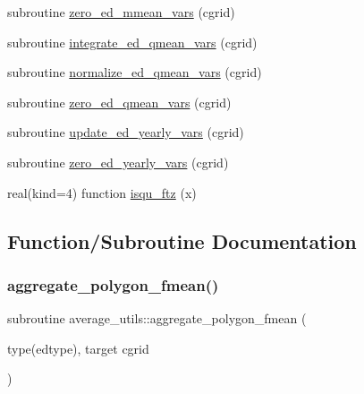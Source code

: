 \begin{DoxyCompactItemize}
\item 
subroutine \hyperlink{namespaceaverage__utils_aa5221fd3b377dfe424dbdcb81b83c378}{zero\+\_\+ed\+\_\+mmean\+\_\+vars} (cgrid)
\item 
subroutine \hyperlink{namespaceaverage__utils_af429d166f6097c18d6ab4ce05adbd31f}{integrate\+\_\+ed\+\_\+qmean\+\_\+vars} (cgrid)
\item 
subroutine \hyperlink{namespaceaverage__utils_ad7f232f9a24079c3430b005098729615}{normalize\+\_\+ed\+\_\+qmean\+\_\+vars} (cgrid)
\item 
subroutine \hyperlink{namespaceaverage__utils_a2e9cb2592327099345c147516b927f51}{zero\+\_\+ed\+\_\+qmean\+\_\+vars} (cgrid)
\item 
subroutine \hyperlink{namespaceaverage__utils_a81384775dd05dba144bf83e9731d5275}{update\+\_\+ed\+\_\+yearly\+\_\+vars} (cgrid)
\item 
subroutine \hyperlink{namespaceaverage__utils_a81df7cc84b1d62f7fb950e91d410abbd}{zero\+\_\+ed\+\_\+yearly\+\_\+vars} (cgrid)
\item 
real(kind=4) function \hyperlink{namespaceaverage__utils_ac90817fe39c27153ed7bbee2cb856611}{isqu\+\_\+ftz} (x)
\end{DoxyCompactItemize}


\subsection{Function/\+Subroutine Documentation}
\mbox{\label{namespaceaverage__utils_a90965230835c19a82d90127089235c76}} 
\subsubsection{\texorpdfstring{aggregate\+\_\+polygon\+\_\+fmean()}{aggregate\_polygon\_fmean()}}
{\footnotesize\ttfamily subroutine average\+\_\+utils\+::aggregate\+\_\+polygon\+\_\+fmean (\begin{DoxyParamCaption}\item[{type(edtype), target}]{cgrid }\end{DoxyParamCaption})}

